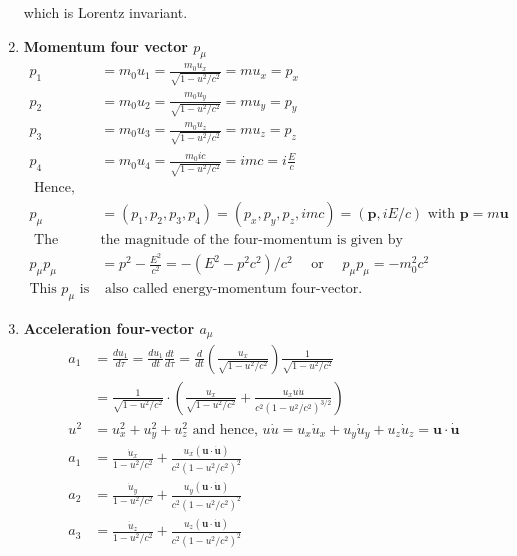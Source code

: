 \begin{enumerate}
	which is Lorentz invariant.
	\item \textbf{ Momentum four vector $p_{\mu}$}
	\begin{align*}
		p_{1}&=m_{0} u_{1}=\frac{m_{0} u_{x}}{\sqrt{1-u^{2} / c^{2}}}=m u_{x}=p_{x} \\
		p_{2}&=m_{0} u_{2}=\frac{m_{0} u_{y}}{\sqrt{1-u^{2} / c^{2}}}=m u_{y}=p_{y} \\
		p_{3}&=m_{0} u_{3}=\frac{m_{0} u_{z}}{\sqrt{1-u^{2} / c^{2}}}=m u_{z}=p_{z} \\
		p_{4}&=m_{0} u_{4}=\frac{m_{0} i c}{\sqrt{1-u^{2} / c^{2}}}=i m c=i \frac{E}{c}\\
		\text{	Hence,}\\
		p_{\mu}&=\left(p_{1}, p_{2}, p_{3}, p_{4}\right)=\left(p_{x}, p_{y}, p_{z}, i m c\right)=(\mathbf{p}, i E / c) \text { with } \mathbf{p}=m \mathbf{u}\\
		\text{	The square of }&\text{the magnitude of the four-momentum is given by}\\
		p_{\mu} p_{\mu}&=p^{2}-\frac{E^{2}}{c^{2}}=-\left(E^{2}-p^{2} c^{2}\right) / c^{2} \quad \text { or } \quad p_{\mu} p_{\mu}=-m_{0}^{2} c^{2}\\
		\text{This $p_{\mu}$ is}&\text{ also called energy-momentum four-vector.}
	\end{align*}
	\item \textbf{ Acceleration four-vector $a_{\mu}$}
	\begin{align*}
	a_{1}&=\frac{d u_{1}}{d \tau}=\frac{d u_{1}}{d t} \frac{d t}{d \tau}=\frac{d}{d t}\left(\frac{u_{x}}{\sqrt{1-u^{2} / c^{2}}}\right) \frac{1}{\sqrt{1-u^{2} / c^{2}}}\\
	&=\frac{1}{\sqrt{1-u^{2} / c^{2}}} \cdot\left(\frac{u_{x}}{\sqrt{1-u^{2} / c^{2}}}+\frac{u_{x} u \dot{u}}{c^{2}\left(1-u^{2} / c^{2}\right)^{3 / 2}}\right)\\
	u^{2}&=u_{x}^{2}+u_{y}^{2}+u_{z}^{2} \text { and hence, } u \dot{u}=u_{x} \dot{u}_{x}+u_{y} \dot{u}_{y}+u_{z} \dot{u}_{z}=\mathbf{u} \cdot \dot{\mathbf{u}}\\
	a_{1}&=\frac{\dot{u}_{x}}{1-u^{2} / c^{2}}+\frac{u_{x}(\mathbf{u} \cdot \dot{\mathbf{u}})}{c^{2}\left(1-u^{2} / c^{2}\right)^{2}}\\
	a_{2}&=\frac{\dot{u}_{y}}{1-u^{2} / c^{2}}+\frac{u_{y}(\mathbf{u} \cdot \dot{\mathbf{u}})}{c^{2}\left(1-u^{2} / c^{2}\right)^{2}}\\
	a_{3}&=\frac{\dot{u}_{z}}{1-u^{2} / c^{2}}+\frac{u_{z}(\mathbf{u} \cdot \dot{\mathbf{u}})}{c^{2}\left(1-u^{2} / c^{2}\right)^{2}}\\

\end{align*}
\end{enumerate}
